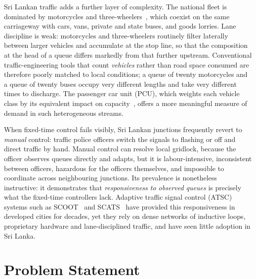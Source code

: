 Sri Lankan traffic adds a further layer of complexity. The national fleet is dominated by motorcycles and three-wheelers~\cite{dmt_stats}, which coexist on the same carriageway with cars, vans, private and state buses, and goods lorries. Lane discipline is weak: motorcycles and three-wheelers routinely filter laterally between larger vehicles and accumulate at the stop line, so that the composition at the head of a queue differs markedly from that further upstream. Conventional traffic-engineering tools that count \emph{vehicles} rather than road space consumed are therefore poorly matched to local conditions; a queue of twenty motorcycles and a queue of twenty buses occupy very different lengths and take very different times to discharge. The passenger car unit (PCU), which weights each vehicle class by its equivalent impact on capacity~\cite{irc106,hcm2016}, offers a more meaningful measure of demand in such heterogeneous streams.

When fixed-time control fails visibly, Sri Lankan junctions frequently revert to \emph{manual} control: traffic police officers switch the signals to flashing or off and direct traffic by hand. Manual control can resolve local gridlock, because the officer observes queues directly and adapts, but it is labour-intensive, inconsistent between officers, hazardous for the officers themselves, and impossible to coordinate across neighbouring junctions. Its prevalence is nonetheless instructive: it demonstrates that \emph{responsiveness to observed queues} is precisely what the fixed-time controllers lack. Adaptive traffic signal control (ATSC) systems such as SCOOT~\cite{hunt1981scoot} and SCATS~\cite{sims1980scats} have provided this responsiveness in developed cities for decades, yet they rely on dense networks of inductive loops, proprietary hardware and lane-disciplined traffic, and have seen little adoption in Sri Lanka.

\section{Problem Statement}\label{sec:intro-problem}

